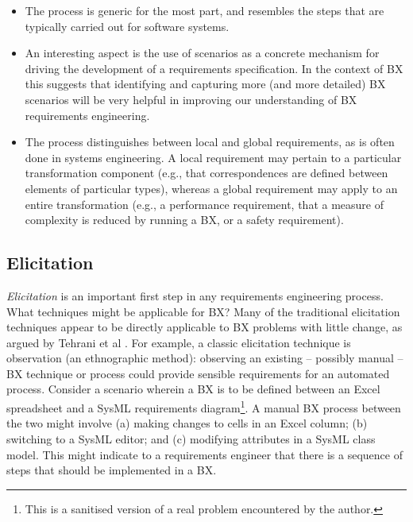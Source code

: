\begin{itemize}
\item The process is generic for the most part, and resembles the steps that are typically carried out for software systems.

\item An interesting aspect is the use of scenarios as a concrete mechanism for driving the development of a requirements specification. In the context of BX this suggests that identifying and capturing more (and more detailed) BX scenarios will be very helpful in improving our understanding of BX requirements engineering.

\item The process distinguishes between local and global requirements, as is often done in systems engineering. A local requirement may pertain to a particular transformation component (e.g., that correspondences are defined between elements of particular types), whereas a global requirement may apply to an entire transformation (e.g., a performance requirement, that a measure of complexity is reduced by running a BX, or a safety requirement).
\end{itemize}

\subsection{Elicitation}
\textit{Elicitation} is an important first step in any requirements engineering process. What techniques might be applicable for BX? Many of the traditional elicitation techniques appear to be directly applicable to BX problems with little change, as argued by Tehrani et al \cite{TehraniZL16}. For example, a classic elicitation technique is observation (an ethnographic method): observing an existing -- possibly manual -- BX technique or process could provide sensible requirements for an automated process. Consider a scenario wherein a BX is to be defined between an Excel spreadsheet and a SysML requirements diagram\footnote{This is a sanitised version of a real problem encountered by the author.}. A manual BX process between the two might involve (a) making changes to cells in an Excel column; (b) switching to a SysML editor; and (c) modifying attributes in a SysML class model. This might indicate to a requirements engineer that there is a sequence of steps that should be implemented in a BX.

